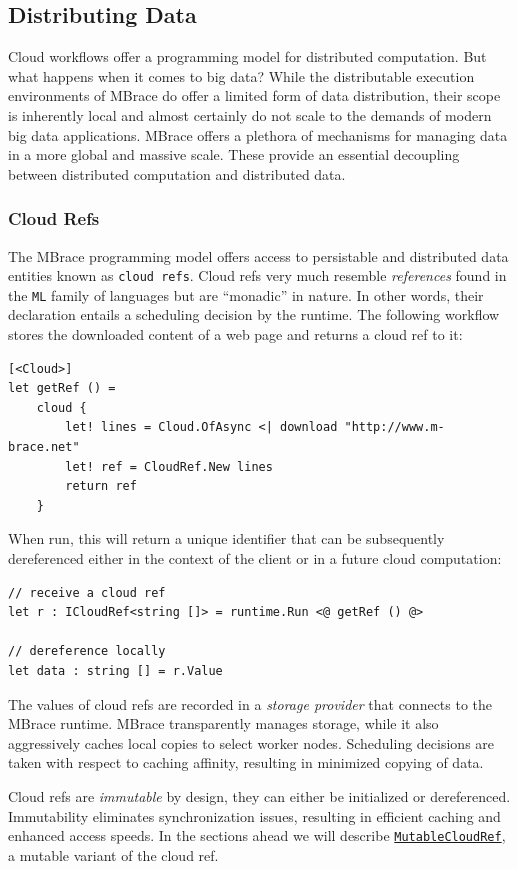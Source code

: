 \documentclass[9pt,a4paper]{article}
\newcommand{\mbrace}{MBrace}
\newcommand{\Mbrace}{MBrace}
\begin{document}
\subsection{Distributing Data}

Cloud workflows offer a programming model for distributed computation.
But what happens when it comes to big data?
While the distributable execution environments of \mbrace{} do offer a
limited form of data distribution, their scope is inherently local
and almost certainly do not scale to the demands of modern big data applications.
\Mbrace{} offers a plethora of mechanisms for managing data in a more global and massive
scale. These provide an essential decoupling between distributed computation and
distributed data.

\subsubsection*{Cloud Refs}

The \mbrace{} programming model offers access to persistable and distributed data entities
known as \texttt{cloud refs}. Cloud refs very much resemble \emph{references} found in the 
\texttt{ML} family of languages but are “monadic” in nature. In other words, their declaration
entails a scheduling decision by the runtime. The following workflow stores the downloaded
content of a web page
and returns a cloud ref to it:
\begin{lstlisting}
[<Cloud>]
let getRef () =
    cloud {
        let! lines = Cloud.OfAsync <| download "http://www.m-brace.net"
        let! ref = CloudRef.New lines
        return ref
    }
\end{lstlisting}
When run, this will return a unique identifier that can be subsequently 
dereferenced either in the context of the client or in a future cloud computation:
\begin{lstlisting}
// receive a cloud ref
let r : ICloudRef<string []> = runtime.Run <@ getRef () @>

// dereference locally
let data : string [] = r.Value
\end{lstlisting}

The values of cloud refs are recorded in a \emph{storage provider} that
connects to the \mbrace{} runtime. \Mbrace{} transparently manages storage,
while it also aggressively caches local copies to select worker nodes.
Scheduling decisions are taken with respect to caching affinity, 
resulting in minimized copying of data.

Cloud refs are \emph{immutable} by design, they can either be initialized or dereferenced.
Immutability eliminates synchronization issues, resulting in efficient caching 
and enhanced access speeds. In the sections ahead we will describe
\hyperref[mutableCloudRef]{\texttt{MutableCloudRef}}, a mutable variant of the cloud ref.
\end{document}

